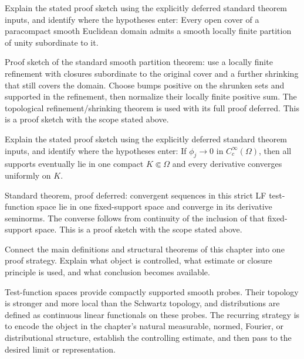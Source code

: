\begin{problem}\label{prob:iii15-problem-10}
Explain the stated proof sketch using the explicitly deferred standard theorem inputs, and identify where the hypotheses enter: Every open cover of a paracompact smooth Euclidean domain admits a smooth locally finite partition of unity subordinate to it.
\end{problem}
\begin{solution}
Proof sketch of the standard smooth partition theorem: use a locally finite refinement with closures subordinate to the original cover and a further shrinking that still covers the domain. Choose bumps positive on the shrunken sets and supported in the refinement, then normalize their locally finite positive sum. The topological refinement/shrinking theorem is used with its full proof deferred. This is a proof sketch with the scope stated above.
\end{solution}

\begin{problem}\label{prob:iii15-problem-11}
Explain the stated proof sketch using the explicitly deferred standard theorem inputs, and identify where the hypotheses enter: If $\phi_j\to0$ in $C_c^\infty(\Omega)$, then all supports eventually lie in one compact $K\Subset\Omega$ and every derivative converges uniformly on $K$.
\end{problem}
\begin{solution}
Standard theorem, proof deferred: convergent sequences in this strict LF test-function space lie in one fixed-support space and converge in its derivative seminorms. The converse follows from continuity of the inclusion of that fixed-support space. This is a proof sketch with the scope stated above.
\end{solution}

\begin{problem}\label{prob:iii15-problem-12}
Connect the main definitions and structural theorems of this chapter into one proof strategy. Explain what object is controlled, what estimate or closure principle is used, and what conclusion becomes available.
\end{problem}
\begin{solution}
Test-function spaces provide compactly supported smooth probes. Their topology is stronger and more local than the Schwartz topology, and distributions are defined as continuous linear functionals on these probes. The recurring strategy is to encode the object in the chapter's natural measurable, normed, Fourier, or distributional structure, establish the controlling estimate, and then pass to the desired limit or representation.
\end{solution}
